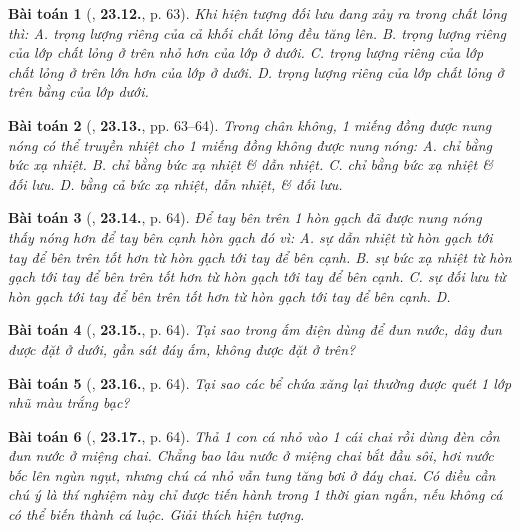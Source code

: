 \documentclass{article}
\numberwithin{equation}{section}
\newtheorem{baitoan}{Bài toán}
\begin{document}
\begin{baitoan}[\cite{SBT_Vat_Ly_8}, \textbf{23.12.}, p. 63]
	Khi hiện tượng đối lưu đang xảy ra trong chất lỏng thì: {\sf A.} trọng lượng riêng của cả khối chất lỏng đều tăng lên. {\sf B.} trọng lượng riêng của lớp chất lỏng ở trên nhỏ hơn của lớp ở dưới. {\sf C.} trọng lượng riêng của lớp chất lỏng ở trên lớn hơn của lớp ở dưới. {\sf D.} trọng lượng riêng của lớp chất lỏng ở trên bằng của lớp dưới.
\end{baitoan}

\begin{baitoan}[\cite{SBT_Vat_Ly_8}, \textbf{23.13.}, pp. 63--64]
	Trong chân không, 1 miếng đồng được nung nóng có thể truyền nhiệt cho 1 miếng đồng không được nung nóng: {\sf A.} chỉ bằng bức xạ nhiệt. {\sf B.} chỉ bằng bức xạ nhiệt \& dẫn nhiệt. {\sf C.} chỉ bằng bức xạ nhiệt \& đối lưu. {\sf D.} bằng cả bức xạ nhiệt, dẫn nhiệt, \& đối lưu.
\end{baitoan}

\begin{baitoan}[\cite{SBT_Vat_Ly_8}, \textbf{23.14.}, p. 64]
	Để tay bên trên 1 hòn gạch đã được nung nóng thấy nóng hơn để tay bên cạnh hòn gạch đó vì: {\sf A.} sự dẫn nhiệt từ hòn gạch tới tay để bên trên tốt hơn từ hòn gạch tới tay để bên cạnh. {\sf B.} sự bức xạ nhiệt từ hòn gạch tới tay để bên trên tốt hơn từ hòn gạch tới tay để bên cạnh. {\sf C.} sự đối lưu từ hòn gạch tới tay để bên trên tốt hơn từ hòn gạch tới tay để bên cạnh. {\sf D.} 
\end{baitoan}

\begin{baitoan}[\cite{SBT_Vat_Ly_8}, \textbf{23.15.}, p. 64]
	Tại sao trong ấm điện dùng để đun nước, dây đun được đặt ở dưới, gần sát đáy ấm, không được đặt ở trên?
\end{baitoan}

\begin{baitoan}[\cite{SBT_Vat_Ly_8}, \textbf{23.16.}, p. 64]
	Tại sao các bể chứa xăng lại thường được quét 1 lớp nhũ màu trắng bạc?
\end{baitoan}

\begin{baitoan}[\cite{SBT_Vat_Ly_8}, \textbf{23.17.}, p. 64]
	Thả 1 con cá nhỏ vào 1 cái chai rồi dùng đèn cồn đun nước ở miệng chai. Chẳng bao lâu nước ở miệng chai bắt đầu sôi, hơi nước bốc lên ngùn ngụt, nhưng chú cá nhỏ vẫn tung tăng bơi ở đáy chai. Có điều cần chú ý là thí nghiệm này chỉ được tiến hành trong 1 thời gian ngắn, nếu không cá có thể biến thành cá luộc. Giải thích hiện tượng.
\end{baitoan}
\end{document}
